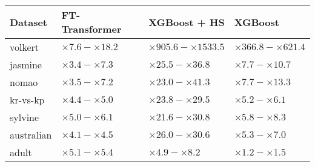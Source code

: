 \begin{tabular}{llll}
\toprule
Dataset & FT-Transformer & XGBoost + HS & XGBoost \\
\midrule
volkert & $\times 7.6 - \times 18.2$ & $\times 905.6 - \times 1533.5$ & $\times 366.8 - \times 621.4$ \\
jasmine & $\times 3.4 - \times 7.3$ & $\times 25.5 - \times 36.8$ & $\times 7.7 - \times 10.7$ \\
nomao & $\times 3.5 - \times 7.2$ & $\times 23.0 - \times 41.3$ & $\times 7.7 - \times 13.3$ \\
kr-vs-kp & $\times 4.4 - \times 5.0$ & $\times 23.8 - \times 29.5$ & $\times 5.2 - \times 6.1$ \\
sylvine & $\times 5.0 - \times 6.1$ & $\times 21.6 - \times 30.8$ & $\times 5.8 - \times 8.3$ \\
australian & $\times 4.1 - \times 4.5$ & $\times 26.0 - \times 30.6$ & $\times 5.3 - \times 7.0$ \\
adult & $\times 5.1 - \times 5.4$ & $\times 4.9 - \times 8.2$ & $\times 1.2 - \times 1.5$ \\
\bottomrule
\end{tabular}
